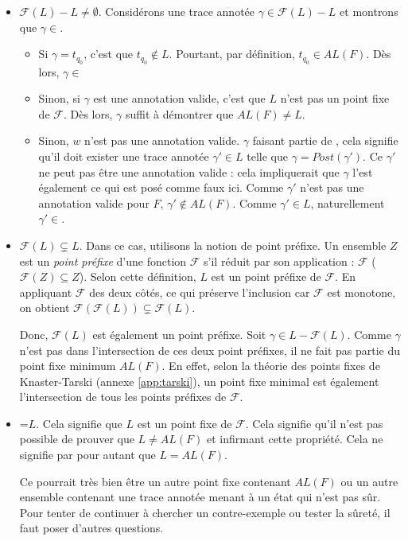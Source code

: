 \begin{itemize}
  \item $\mathcal{F}(L)-L\neq\emptyset$. Considérons une trace annotée $\gamma\in\mathcal{F}(L)-L$ et montrons que $\gamma\in$\alfx.
  \begin{itemize}
    \item Si $\gamma=t_{q_0}$, c'est que $t_{q_0}\notin L$. Pourtant, par définition, $t_{q_0}\in AL(F)$. Dès lors, $\gamma\in$\alfx
    \item Sinon, si $\gamma$ est une annotation valide, c'est que $L$ n'est pas un point fixe de $\mathcal{F}$. Dès lors, $\gamma$ suffit à démontrer que $AL(F)\neq L$.
    \item Sinon, $w$ n'est pas une annotation valide. $\gamma$ faisant partie de \fl, cela signifie qu'il doit exister une trace annotée $\gamma'\in L$ telle que $\gamma=Post(\gamma')$. Ce $\gamma'$ ne peut pas être une annotation valide : cela impliquerait que $\gamma$ l'est également ce qui est posé comme faux ici. Comme $\gamma'$ n'est pas une annotation valide pour $F$, $\gamma'\notin AL(F)$. Comme $\gamma'\in L$, naturellement $\gamma'\in$\alfx.
  \end{itemize}
  \item $\mathcal{F}(L)\subsetneq L$. Dans ce cas, utilisons la notion de point préfixe. Un ensemble $Z$ est un \emph{point préfixe} d'une fonction $\mathcal{F}$ s'il réduit par son application : $\mathcal{F}$ ($\mathcal{F}(Z)\subseteq Z$). Selon cette définition, $L$ est un point préfixe de $\mathcal{F}$.
  En appliquant $\mathcal{F}$ des deux côtés, ce qui préserve l'inclusion car $\mathcal{F}$ est monotone, on obtient $\mathcal{F}(\mathcal{F}(L))\subsetneq\mathcal{F}(L)$.

  Donc, $\mathcal{F}(L)$ est également un point préfixe. Soit $\gamma\in L-\mathcal{F}(L)$. Comme $\gamma$ n'est pas dans l'intersection de ces deux point préfixes, il ne fait pas partie du point fixe minimum $AL(F)$. En effet, selon la théorie des points fixes de Knaster-Tarski (annexe \ref{app:tarski}), un point fixe minimal est également l'intersection de tous les points préfixes de $\mathcal{F}$.

  \item \fl=$L$. Cela signifie que $L$ est un point fixe de $\mathcal{F}$. Cela signifie qu'il n'est pas possible de prouver que $L\neq AL(F)$ et infirmant cette propriété. Cela ne signifie par pour autant que $L=AL(F)$.

  Ce pourrait très bien être un autre point fixe contenant $AL(F)$ ou un autre ensemble contenant une trace annotée menant à un état qui n'est pas sûr. Pour tenter de continuer à chercher un contre-exemple ou tester la sûreté, il faut poser d'autres questions.

\end{itemize}

